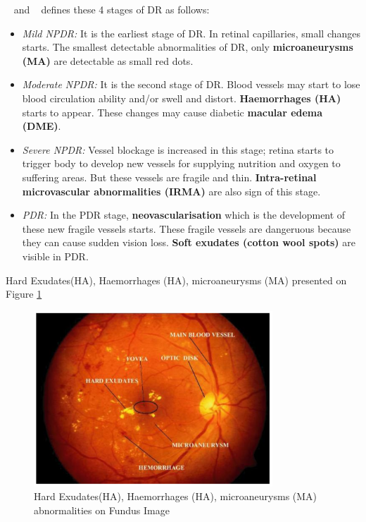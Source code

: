 ~\cite{NationalEyeInstitute} and ~\cite{wilkinson2003proposed} defines these 4 stages of DR as follows:
\begin{enumerate}
    \begin{itemize}
        \item \textit{Mild NPDR:} It is the earliest stage of DR. In retinal capillaries, small changes starts. The smallest detectable abnormalities of DR, only \textbf{microaneurysms (MA)} are detectable as small red dots.
        \item \textit{Moderate NPDR:} It is the second stage of DR. Blood vessels may start to lose blood circulation ability and/or swell and distort. \textbf{Haemorrhages (HA)} starts to appear. These changes may cause diabetic \textbf{macular edema (DME)}.  
        \item \textit{Severe NPDR:} Vessel blockage is increased in this stage; retina starts to trigger body to develop new vessels for supplying nutrition and oxygen to suffering areas. But these vessels are fragile and thin. \textbf{Intra-retinal microvascular abnormalities (IRMA)} are also sign of this stage. 
        \item \textit{PDR:} In the PDR stage, \textbf{neovascularisation} which is the development of these new fragile vessels starts. These fragile vessels  are dangeruous because they can cause sudden vision loss. \textbf{Soft exudates (cotton wool spots)} are visible in PDR. 
    \end{itemize}
\end{enumerate}


Hard Exudates(HA), Haemorrhages (HA), microaneurysms (MA) presented on Figure \ref{AbnormalitiesFundusImage}

\begin{figure}[t]
\caption{Hard Exudates(HA), Haemorrhages (HA), microaneurysms (MA) abnormalities on Fundus Image ~\cite{kekre2013hybrid}}
\label{AbnormalitiesFundusImage}
\centering
\includegraphics[width=0.8\textwidth]{Figures/retina_abnormalities}
\end{figure}

